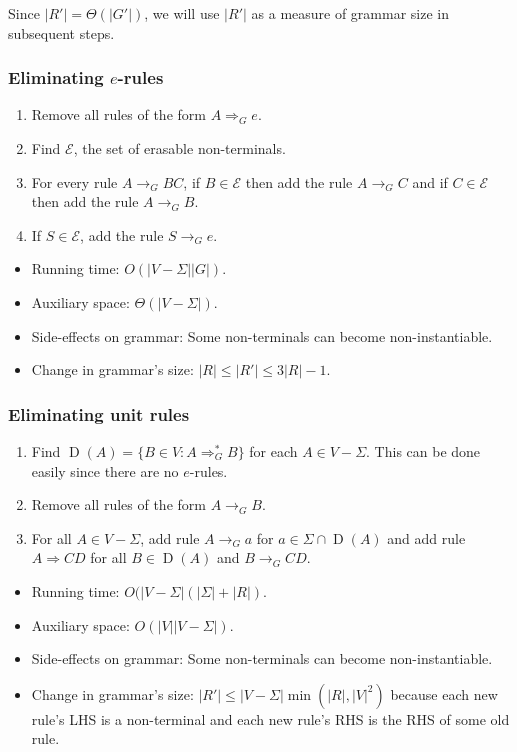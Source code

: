 Since $|R'| = \Theta(|G'|)$, we will use $|R'|$ as a measure of grammar size in subsequent steps.

\subsubsection[Eliminating e-rules]{Eliminating $e$-rules}

\begin{enumerate}
\item Remove all rules of the form $A \Rightarrow_G e$.
\item Find $\mathcal{E}$, the set of erasable non-terminals.
\item For every rule $A \rightarrow_G BC$,
    if $B \in \mathcal{E}$ then add the rule $A \rightarrow_G C$
    and if $C \in \mathcal{E}$ then add the rule $A \rightarrow_G B$.
\item If $S \in \mathcal{E}$, add the rule $S \rightarrow_G e$.
\end{enumerate}

\begin{itemize}
\item Running time: $O(|V-\Sigma||G|)$.
\item Auxiliary space: $\Theta(|V-\Sigma|)$.
\item Side-effects on grammar: Some non-terminals can become non-instantiable.
\item Change in grammar's size: $|R| \le |R'| \le 3|R|-1$.
\end{itemize}

\subsubsection{Eliminating unit rules}

\begin{enumerate}
\item Find $\operatorname{D}(A) = \{B \in V: A \Rightarrow_G^* B\}$ for each $A \in V-\Sigma$.
    This can be done easily since there are no $e$-rules.
\item Remove all rules of the form $A \rightarrow_G B$.
\item For all $A \in V - \Sigma$, add rule $A \rightarrow_G a$ for $a \in \Sigma \cap \operatorname{D}(A)$
    and add rule $A \Rightarrow CD$ for all $B \in \operatorname{D}(A)$ and $B \rightarrow_G CD$.
\end{enumerate}

\begin{itemize}
\item Running time: $O(|V-\Sigma|(|\Sigma| + |R|)$.
\item Auxiliary space: $O(|V||V-\Sigma|)$.
\item Side-effects on grammar: Some non-terminals can become non-instantiable.
\item Change in grammar's size: $|R'| \le |V-\Sigma|\min(|R|, |V|^2)$
    because each new rule's LHS is a non-terminal and each new rule's RHS is the RHS of some old rule.
\end{itemize}

